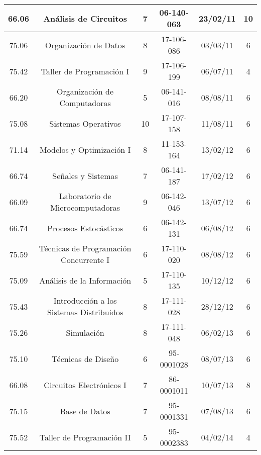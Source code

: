 {\begin{center}
\begin{tabular}{|c|c|c|c|c|c|}
            \hline
            66.06 & Análisis de Circuitos                      & 7  & 06-140-063 & 23/02/11 & 10 \\
            \hline
            75.06 & Organización de Datos                      & 8  & 17-106-086 & 03/03/11 & 6 \\
            \hline
            75.42 & Taller de Programación I                   & 9  & 17-106-199 & 06/07/11 & 4 \\
            \hline
            66.20 & Organización de Computadoras               & 5  & 06-141-016 & 08/08/11 & 6 \\
            \hline
            75.08 & Sistemas Operativos                        & 10 & 17-107-158 & 11/08/11 & 6 \\
            \hline 
            71.14 & Modelos y Optimización I                   & 8  & 11-153-164 & 13/02/12 & 6 \\
            \hline
            66.74 & Señales y Sistemas                         & 7  & 06-141-187 & 17/02/12 & 6 \\
            \hline
            66.09 & Laboratorio de Microcomputadoras           & 9  & 06-142-046 & 13/07/12 & 6 \\
            \hline
            66.74 & Procesos Estocásticos                      & 6  & 06-142-131 & 06/08/12 & 6 \\
            \hline
            75.59 & Técnicas de Programación Concurrente I     & 6  & 17-110-020 & 08/08/12 & 6 \\
            \hline
            75.09 & Análisis de la Información                 & 5  & 17-110-135 & 10/12/12 & 6 \\
            \hline
            75.43 & Introducción a los Sistemas Distribuidos   & 8  & 17-111-028 & 28/12/12 & 6 \\
            \hline
            75.26 & Simulación                                 & 8  & 17-111-048 & 06/02/13 & 6 \\
            \hline
            75.10 & Técnicas de Diseño                         & 6  & 95-0001028 & 08/07/13 & 6 \\
            \hline
            66.08 & Circuitos Electrónicos I                   & 7  & 86-0001011 & 10/07/13 & 8 \\
            \hline
            75.15 & Base de Datos                              & 7  & 95-0001331 & 07/08/13 & 6 \\
            \hline
            75.52 & Taller de Programación II                  & 5  & 95-0002383 & 04/02/14 & 4 \\

\end{tabular}
\end{center}}
